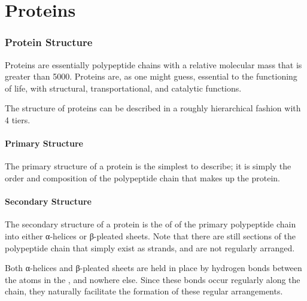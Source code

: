 
\pagebreak
\hypertarget{ChapterProteins}{}
\part{Proteins}


	\section{Protein Structure}

		Proteins are essentially polypeptide chains with a relative molecular mass that is greater than 5000. Proteins are, as one might
		guess, essential to the functioning of life, with structural, transportational, and catalytic functions.

		The structure of proteins can be described in a roughly hierarchical fashion with 4 tiers.

		\subsection{Primary Structure}

			The primary structure of a protein is the simplest to describe; it is simply the order and composition of the polypeptide chain
			that makes up the protein.



		\subsection{Secondary Structure}

			The secondary structure of a protein is the  of  of the primary polypeptide chain into either
			α-helices or β-pleated sheets. Note that there are still sections of the polypeptide chain that simply exist as
			strands, and are not regularly arranged.

			Both α-helices and β-pleated sheets are held in place by hydrogen bonds between the atoms in the ,
			and nowhere else. Since these bonds occur regularly along the chain, they naturally facilitate the formation of these regular
			arrangements.


